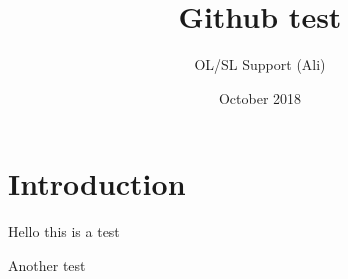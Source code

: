 \documentclass{article}
\title{Github test}
\author{OL/SL Support (Ali) }
\date{October 2018}
\begin{document}
\maketitle

\section{Introduction}

Hello this is a test

Another test
\end{document}
